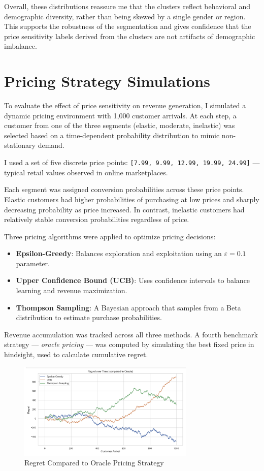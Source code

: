 \documentclass[12pt]{article}
\begin{document}
Overall, these distributions reassure me that the clusters reflect behavioral and demographic diversity, rather than being skewed by a single gender or region. This supports the robustness of the segmentation and gives confidence that the price sensitivity labels derived from the clusters are not artifacts of demographic imbalance.



\section{Pricing Strategy Simulations}

To evaluate the effect of price sensitivity on revenue generation, I simulated a dynamic pricing environment with 1,000 customer arrivals. At each step, a customer from one of the three segments (elastic, moderate, inelastic) was selected based on a time-dependent probability distribution to mimic non-stationary demand.

I used a set of five discrete price points: \texttt{[7.99, 9.99, 12.99, 19.99, 24.99]} — typical retail values observed in online marketplaces.

Each segment was assigned conversion probabilities across these price points. Elastic customers had higher probabilities of purchasing at low prices and sharply decreasing probability as price increased. In contrast, inelastic customers had relatively stable conversion probabilities regardless of price.

Three pricing algorithms were applied to optimize pricing decisions:
\begin{itemize}
  \item \textbf{Epsilon-Greedy}: Balances exploration and exploitation using an \( \varepsilon = 0.1 \) parameter.
  \item \textbf{Upper Confidence Bound (UCB)}: Uses confidence intervals to balance learning and revenue maximization.
  \item \textbf{Thompson Sampling}: A Bayesian approach that samples from a Beta distribution to estimate purchase probabilities.
\end{itemize}


Revenue accumulation was tracked across all three methods. A fourth benchmark strategy — \textit{oracle pricing} — was computed by simulating the best fixed price in hindsight, used to calculate cumulative regret.

\begin{figure}[h!]
  \centering
  \includegraphics[width=0.75\textwidth]{regret overtime.png}
  \caption{Regret Compared to Oracle Pricing Strategy}
  \label{fig:regret}
\end{figure}
\end{document}
